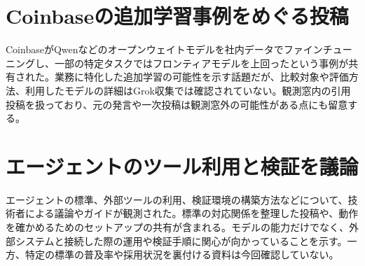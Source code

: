 \section{Coinbaseの追加学習事例をめぐる投稿}
CoinbaseがQwenなどのオープンウェイトモデルを社内データでファインチューニングし、一部の特定タスクではフロンティアモデルを上回ったという事例が共有された。業務に特化した追加学習の可能性を示す話題だが、比較対象や評価方法、利用したモデルの詳細はGrok収集では確認されていない。観測窓内の引用投稿を扱っており、元の発言や一次投稿は観測窓外の可能性がある点にも留意する。

\section{エージェントのツール利用と検証を議論}
エージェントの標準、外部ツールの利用、検証環境の構築方法などについて、技術者による議論やガイドが観測された。標準の対応関係を整理した投稿や、動作を確かめるためのセットアップの共有が含まれる。モデルの能力だけでなく、外部システムと接続した際の運用や検証手順に関心が向かっていることを示す。一方、特定の標準の普及率や採用状況を裏付ける資料は今回確認していない。
